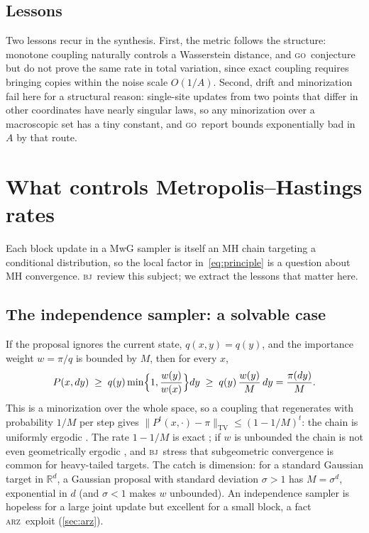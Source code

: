 \documentclass[11pt]{article}
\theoremstyle{remark}
\newcommand{\ARZ}{\textsc{arz}}
\newcommand{\GO}{\textsc{go}}
\newcommand{\BJ}{\textsc{bj}}
\newcommand{\TV}{\mathrm{TV}}
\begin{document}
\subsection{Lessons}
Two lessons recur in the synthesis. First, the metric follows the structure: monotone coupling naturally controls a Wasserstein distance, and \GO\ conjecture but do not prove the same rate in total variation, since exact coupling requires bringing copies within the noise scale $O(1/A)$. Second, drift and minorization fail here for a structural reason: single-site updates from two points that differ in other coordinates have nearly singular laws, so any minorization over a macroscopic set has a tiny constant, and \GO\ report bounds exponentially bad in $A$ by that route.

\section{What controls Metropolis--Hastings rates}\label{sec:mh}

Each block update in a MwG sampler is itself an MH chain targeting a conditional distribution, so the local factor in~\eqref{eq:principle} is a question about MH convergence. \BJ\ review this subject; we extract the lessons that matter here.

\subsection{The independence sampler: a solvable case}
If the proposal ignores the current state, $q(x,y)=q(y)$, and the importance weight $w=\pi/q$ is bounded by $M$, then for every $x$,
\[
P(x,dy)\;\ge\;q(y)\min\Bigl\{1,\frac{w(y)}{w(x)}\Bigr\}dy\;\ge\;q(y)\,\frac{w(y)}{M}\,dy=\frac{\pi(dy)}{M}.
\]
This is a minorization over the whole space, so a coupling that regenerates with probability $1/M$ per step gives $\|P^t(x,\cdot)-\pi\|_\TV\le(1-1/M)^t$: the chain is uniformly ergodic \citep{tierney1994,mengersen1996}. The rate $1-1/M$ is exact \citep{wang2022exact}; if $w$ is unbounded the chain is not even geometrically ergodic \citep{mengersen1996}, and \BJ\ stress that subgeometric convergence is common for heavy-tailed targets. The catch is dimension: for a standard Gaussian target in $\mathbb R^d$, a Gaussian proposal with standard deviation $\sigma>1$ has $M=\sigma^d$, exponential in $d$ (and $\sigma<1$ makes $w$ unbounded). An independence sampler is hopeless for a large joint update but excellent for a small block, a fact \ARZ\ exploit (\cref{sec:arz}).
\end{document}
